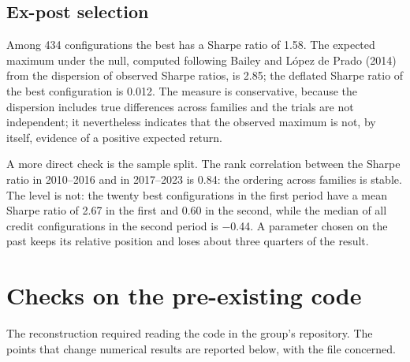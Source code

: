 \documentclass[11pt,a4paper]{article}
\begin{document}
\subsection{Ex-post selection}

Among 434 configurations the best has a Sharpe ratio of 1.58. The expected maximum under the null, computed following Bailey and López de Prado (2014) from the dispersion of observed Sharpe ratios, is 2.85; the deflated Sharpe ratio of the best configuration is 0.012. The measure is conservative, because the dispersion includes true differences across families and the trials are not independent; it nevertheless indicates that the observed maximum is not, by itself, evidence of a positive expected return.

A more direct check is the sample split. The rank correlation between the Sharpe ratio in 2010--2016 and in 2017--2023 is 0.84: the ordering across families is stable. The level is not: the twenty best configurations in the first period have a mean Sharpe ratio of 2.67 in the first and 0.60 in the second, while the median of all credit configurations in the second period is $-$0.44. A parameter chosen on the past keeps its relative position and loses about three quarters of the result.

\section{Checks on the pre-existing code}\label{sec:codice}

The reconstruction required reading the code in the group's repository. The points that change numerical results are reported below, with the file concerned.
\end{document}
